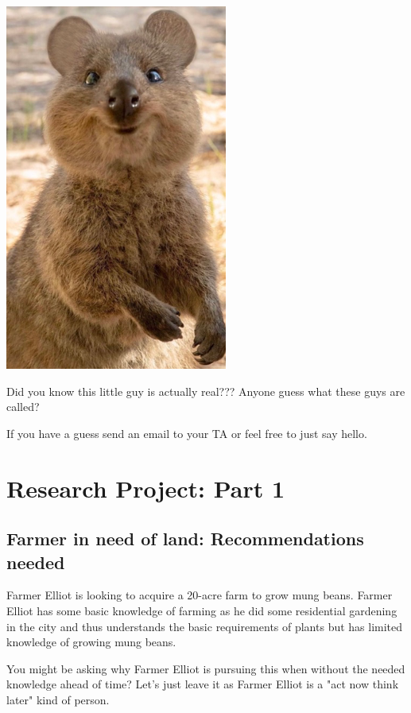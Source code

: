 \documentclass[
]{book}
\begin{document}
\includegraphics{images/img-1.png}

Did you know this little guy is actually real??? Anyone guess what these guys are called?

If you have a guess send an email to your TA or feel free to just say hello.

\hypertarget{research-project-part-1}{%
\chapter*{Research Project: Part 1}\label{research-project-part-1}}

\hypertarget{farmer-in-need-of-land-recommendations-needed}{%
\section*{Farmer in need of land: Recommendations needed}\label{farmer-in-need-of-land-recommendations-needed}}

Farmer Elliot is looking to acquire a 20-acre farm to grow mung beans. Farmer Elliot has some basic knowledge of farming as he did some residential gardening in the city and thus understands the basic requirements of plants but has limited knowledge of growing mung beans.

You might be asking why Farmer Elliot is pursuing this when without the needed knowledge ahead of time? Let's just leave it as Farmer Elliot is a "act now think later" kind of person.
\end{document}
